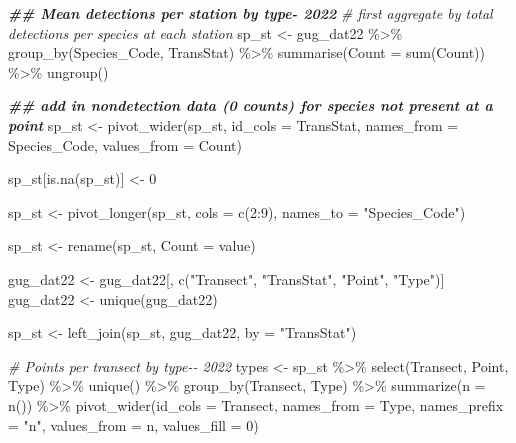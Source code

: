 \documentclass[
]{article}
\newenvironment{Shaded}{\begin{snugshade}}{\end{snugshade}}
\newcommand{\AttributeTok}[1]{\textcolor[rgb]{0.77,0.63,0.00}{#1}}
\newcommand{\CommentTok}[1]{\textcolor[rgb]{0.56,0.35,0.01}{\textit{#1}}}
\newcommand{\DecValTok}[1]{\textcolor[rgb]{0.00,0.00,0.81}{#1}}
\newcommand{\DocumentationTok}[1]{\textcolor[rgb]{0.56,0.35,0.01}{\textbf{\textit{#1}}}}
\newcommand{\FunctionTok}[1]{\textcolor[rgb]{0.00,0.00,0.00}{#1}}
\newcommand{\NormalTok}[1]{#1}
\newcommand{\OtherTok}[1]{\textcolor[rgb]{0.56,0.35,0.01}{#1}}
\newcommand{\SpecialCharTok}[1]{\textcolor[rgb]{0.00,0.00,0.00}{#1}}
\newcommand{\StringTok}[1]{\textcolor[rgb]{0.31,0.60,0.02}{#1}}
\begin{document}
\begin{Shaded}
\begin{Highlighting}[]
\DocumentationTok{\#\# Mean detections per station by type{-} 2022}
\CommentTok{\# first aggregate by total detections per species at each station}
\NormalTok{sp\_st }\OtherTok{\textless{}{-}}\NormalTok{ gug\_dat22 }\SpecialCharTok{\%\textgreater{}\%}
  \FunctionTok{group\_by}\NormalTok{(Species\_Code, TransStat) }\SpecialCharTok{\%\textgreater{}\%}
  \FunctionTok{summarise}\NormalTok{(}\AttributeTok{Count =} \FunctionTok{sum}\NormalTok{(Count)) }\SpecialCharTok{\%\textgreater{}\%}
  \FunctionTok{ungroup}\NormalTok{()}

\DocumentationTok{\#\# add in nondetection data (0 counts) for species not present at a point}
\NormalTok{sp\_st }\OtherTok{\textless{}{-}} \FunctionTok{pivot\_wider}\NormalTok{(sp\_st, }\AttributeTok{id\_cols =}\NormalTok{ TransStat, }\AttributeTok{names\_from =}\NormalTok{ Species\_Code, }
                     \AttributeTok{values\_from =}\NormalTok{ Count)}

\NormalTok{sp\_st[}\FunctionTok{is.na}\NormalTok{(sp\_st)] }\OtherTok{\textless{}{-}} \DecValTok{0}

\NormalTok{sp\_st }\OtherTok{\textless{}{-}} \FunctionTok{pivot\_longer}\NormalTok{(sp\_st, }\AttributeTok{cols =} \FunctionTok{c}\NormalTok{(}\DecValTok{2}\SpecialCharTok{:}\DecValTok{9}\NormalTok{), }\AttributeTok{names\_to =} \StringTok{"Species\_Code"}\NormalTok{)}

\NormalTok{sp\_st }\OtherTok{\textless{}{-}} \FunctionTok{rename}\NormalTok{(sp\_st, }\AttributeTok{Count =}\NormalTok{ value)}

\NormalTok{gug\_dat22 }\OtherTok{\textless{}{-}}\NormalTok{ gug\_dat22[, }\FunctionTok{c}\NormalTok{(}\StringTok{"Transect"}\NormalTok{, }\StringTok{"TransStat"}\NormalTok{, }\StringTok{"Point"}\NormalTok{, }\StringTok{"Type"}\NormalTok{)]}
\NormalTok{gug\_dat22 }\OtherTok{\textless{}{-}} \FunctionTok{unique}\NormalTok{(gug\_dat22)}

\NormalTok{sp\_st }\OtherTok{\textless{}{-}} \FunctionTok{left\_join}\NormalTok{(sp\_st, gug\_dat22, }\AttributeTok{by =} \StringTok{"TransStat"}\NormalTok{)}


\CommentTok{\# Points per transect by type{-}{-} 2022}
\NormalTok{types }\OtherTok{\textless{}{-}}\NormalTok{ sp\_st }\SpecialCharTok{\%\textgreater{}\%} 
  \FunctionTok{select}\NormalTok{(Transect, Point, Type) }\SpecialCharTok{\%\textgreater{}\%}
  \FunctionTok{unique}\NormalTok{() }\SpecialCharTok{\%\textgreater{}\%}
  \FunctionTok{group\_by}\NormalTok{(Transect, Type) }\SpecialCharTok{\%\textgreater{}\%}
  \FunctionTok{summarize}\NormalTok{(}\AttributeTok{n =} \FunctionTok{n}\NormalTok{()) }\SpecialCharTok{\%\textgreater{}\%}
  \FunctionTok{pivot\_wider}\NormalTok{(}\AttributeTok{id\_cols =}\NormalTok{ Transect,}
              \AttributeTok{names\_from =}\NormalTok{ Type,}
              \AttributeTok{names\_prefix =} \StringTok{"n"}\NormalTok{,}
              \AttributeTok{values\_from =}\NormalTok{ n,}
              \AttributeTok{values\_fill =} \DecValTok{0}\NormalTok{)}


\end{Highlighting}
\end{Shaded}
\end{document}
